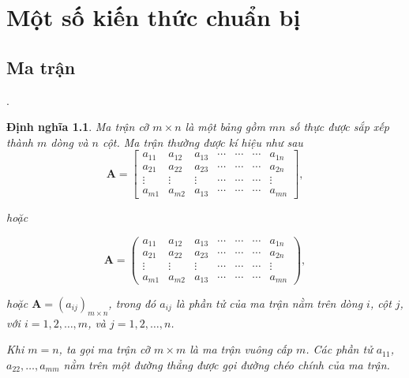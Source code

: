 \documentclass[12pt,a4paper,oneside]{report}
\newtheorem{dn}{Định nghĩa}[section]
\numberwithin{equation}{section}
\begin{document}
{\begin{tabular}{l l}
\end{tabular}
\chapter{Một số kiến thức chuẩn bị}
\section{Ma trận}}.
\begin{dn}\rm                    %
 Ma trận cỡ $m \times n$ là một bảng gồm $m n$ số thực được sắp xếp thành $m$ dòng và $n$ cột. Ma trận thường được kí hiệu như sau\\
 $$
 \mathbf{A}=\left[\begin{array}{ccccccc}
 	a_{11} & a_{12} & a_{13} & \cdots & \cdots & \cdots & a_{1 n} \\
 	a_{21} & a_{22} & a_{23} & \cdots & \cdots & \cdots & a_{2 n} \\
 	\vdots & \vdots & \vdots & \cdots & \cdots & \cdots & \vdots \\
 	a_{m 1} & a_{m 2} & a_{13} & \cdots & \cdots & \cdots & a_{m n}
 \end{array}\right],
 $$
 
 hoặc
 
 $$
 \mathbf{A}=\left(\begin{array}{ccccccc}
 	a_{11} & a_{12} & a_{13} & \cdots & \cdots & \cdots & a_{1 n} \\
 	a_{21} & a_{22} & a_{23} & \cdots & \cdots & \cdots & a_{2 n} \\
 	\vdots & \vdots & \vdots & \cdots & \cdots & \cdots & \vdots \\
 	a_{m 1} & a_{m 2} & a_{13} & \cdots & \cdots & \cdots & a_{m n}
 \end{array}\right),
 $$
 
 hoặc $\mathbf{A}=\left(a_{i j}\right)_{m \times n}$, trong đó $a_{i j}$ là phần tử của ma trận nằm trên dòng $i$, cột $j$, với $i=1,2, \ldots, m$, và $j=1,2, \ldots, n$.
 
 Khi $m=n$, ta gọi ma trận cỡ $m \times m$ là ma trận vuông cấp $m$. Các phần tử $a_{11}$, $a_{22}, \ldots, a_{m m}$ nằm trên một đường thẳng được gọi đường chéo chính của ma trận.
\end{dn}
	
\end{document}
